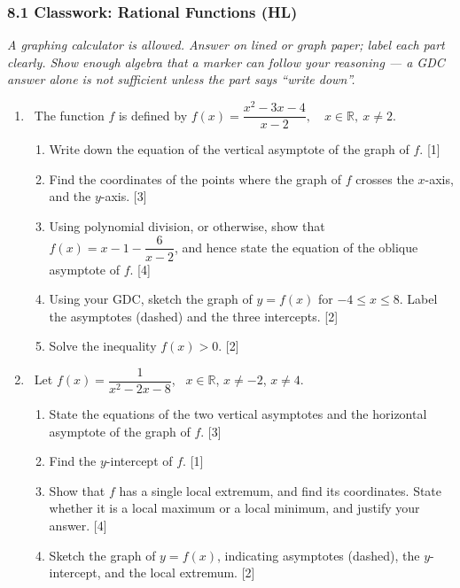 \documentclass[12pt, twoside]{article}
\begin{document}
\subsubsection*{8.1 Classwork: Rational Functions (HL)}

\noindent\emph{A graphing calculator is allowed. Answer on lined or graph paper;
label each part clearly. Show enough algebra that a marker can follow your reasoning
--- a GDC answer alone is not sufficient unless the part says ``write down''.}

\begin{enumerate}[itemsep=0.25cm]

\item[1.] [Maximum mark: 12] \ The function $f$ is defined by
$\displaystyle f(x)=\dfrac{x^{2}-3x-4}{x-2}, \quad x\in\mathbb{R},\ x\ne 2.$

\begin{enumerate}[itemsep=0.1cm]
  \item Write down the equation of the vertical asymptote of the graph of $f$.
  \hfill [1]
  \item Find the coordinates of the points where the graph of $f$ crosses the
  $x$-axis, and the $y$-axis. \hfill [3]
  \item Using polynomial division, or otherwise, show that
  $\displaystyle f(x)=x-1-\dfrac{6}{x-2}$, and hence state the equation of the
  oblique asymptote of $f$. \hfill [4]
  \item Using your GDC, sketch the graph of $y=f(x)$ for $-4\le x\le 8$. Label
  the asymptotes (dashed) and the three intercepts. \hfill [2]
  \item Solve the inequality $f(x)>0$. \hfill [2]
\end{enumerate}

\medskip

\item[2.] [Maximum mark: 10] \ Let $\displaystyle f(x)=\dfrac{1}{x^{2}-2x-8}$,
\ $x\in\mathbb{R}$, $x\ne -2$, $x\ne 4$.

\begin{enumerate}[itemsep=0.1cm]
  \item State the equations of the two vertical asymptotes and the horizontal
  asymptote of the graph of $f$. \hfill [3]
  \item Find the $y$-intercept of $f$. \hfill [1]
  \item Show that $f$ has a single local extremum, and find its coordinates.
  State whether it is a local maximum or a local minimum, and justify your
  answer. \hfill [4]
  \item Sketch the graph of $y=f(x)$, indicating asymptotes (dashed), the
  $y$-intercept, and the local extremum. \hfill [2]
\end{enumerate}


\end{enumerate}
\end{document}
